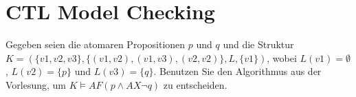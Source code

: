 \documentclass{article}
\begin{document}
\section*{CTL Model Checking}

Gegeben seien die atomaren Propositionen \( p \) und \( q \) und die Struktur 
\( K = (\{v1, v2, v3\}, \{(v1, v2), (v1, v3), (v2, v2)\}, L, \{v1\}) \), 
wobei \( L(v1) = \emptyset \), \( L(v2) = \{p\} \) und \( L(v3) = \{q\} \). 
Benutzen Sie den Algorithmus aus der Vorlesung, um \( K \models AF(p \land AX \neg q) \) zu entscheiden.

\begin{center}
\end{center}
\end{document}
